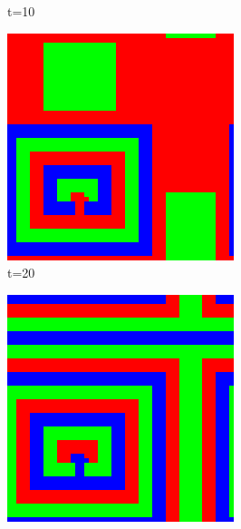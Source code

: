 \documentclass[a4paper, 11pt]{article}
\begin{document}
\begin{landscape}
\begin{figure}[H]
\begin{subfigure}{.20\textwidth}
  \caption{t=10}
\end{subfigure}%
\begin{subfigure}{.20\textwidth}
  \centering
  \includegraphics[width=0.95\linewidth]{ROCK_PAPER_SCISSORS_MOORE_50x50_HighRockPop60_t20}
  \caption{t=20}
\end{subfigure}%
\begin{subfigure}{.20\textwidth}
  \centering
  \includegraphics[width=0.95\linewidth]{ROCK_PAPER_SCISSORS_MOORE_50x50_HighRockPop60_t50}

\end{subfigure}
\end{figure}
\end{landscape}
\end{document}
